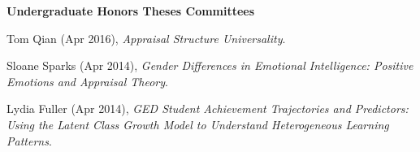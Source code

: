 {\large \textbf{Undergraduate Honors Theses Committees}}
\begin{etaremune}\item Tom Qian (Apr 2016), \textit{Appraisal Structure Universality}.%
%
\item Sloane Sparks (Apr 2014), \textit{Gender Differences in Emotional Intelligence: Positive Emotions and Appraisal Theory}.%
\item Lydia Fuller (Apr 2014), \textit{GED Student Achievement Trajectories and Predictors: Using the Latent Class Growth Model to Understand Heterogeneous Learning Patterns}.%
\end{etaremune}
